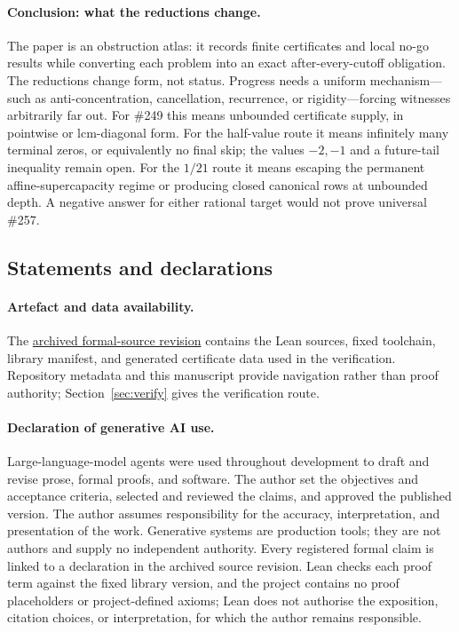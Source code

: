 \documentclass[11pt]{article}
\newcommand{\commit}{bb4e24651b37cd096d3749ef299c3317930b3a3b}
\newcommand{\sourceurl}{https://github.com/wcook04/plectis-lean-erdos249-257/tree/\commit}
\theoremstyle{definition}
\theoremstyle{remark}
\begin{document}
\paragraph{Conclusion: what the reductions change.}
The paper is an obstruction atlas: it records finite certificates and local
no-go results while converting each problem into an exact after-every-cutoff
obligation.  The reductions change form, not status.  Progress needs a uniform
mechanism---such as anti-concentration, cancellation, recurrence, or
rigidity---forcing witnesses arbitrarily far out.  For \#249 this means
unbounded certificate supply, in pointwise or lcm-diagonal form.  For the
half-value route it means infinitely many terminal zeros, or equivalently no
final skip; the values \(-2,-1\) and a future-tail inequality remain open.
For the \(1/21\) route it means escaping the permanent affine-supercapacity
regime or producing closed canonical rows at unbounded depth.  A negative
answer for either rational target would not prove universal \#257.

\subsection*{Statements and declarations}

\paragraph{Artefact and data availability.} The
\href{\sourceurl}{archived formal-source revision} contains the Lean sources,
fixed toolchain, library manifest, and generated certificate data used in the
verification. Repository metadata and this manuscript provide navigation
rather than proof authority; Section~\ref{sec:verify} gives the verification
route.

\paragraph{Declaration of generative AI use.} Large-language-model agents were
used throughout development to draft and revise prose, formal proofs, and
software.  The author set the objectives and acceptance criteria, selected and
reviewed the claims, and approved the published version.  The author assumes
responsibility for the accuracy, interpretation, and presentation of the work.
Generative systems are production tools; they are not authors and supply no
independent authority.  Every registered formal claim is linked to a
declaration in the archived source revision.  Lean checks each proof term
against the fixed library version, and the project contains no proof
placeholders or project-defined axioms; Lean does not authorise the exposition,
citation choices, or interpretation, for which the author remains responsible.
\end{document}
